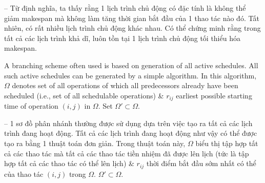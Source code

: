 \documentclass{article}
\begin{document}
\begin{itemize}
\begin{itemize}
        -- Từ định nghĩa, ta thấy rằng 1 lịch trình chủ động có đặc tính là không thể giảm makespan mà không làm tăng thời gian bắt đầu của 1 thao tác nào đó. Tất nhiên, có rất nhiều lịch trình chủ động khác nhau. Có thể chứng minh rằng trong tất cả các lịch trình khả dĩ, luôn tồn tại 1 lịch trình chủ động tối thiểu hóa makespan.

        A branching scheme often used is based on generation of all active schedules. All such active schedules can be generated by a simple algorithm. In this algorithm, $\Omega$ denotes set of all operations of which all predecessors already have been scheduled (i.e., set of all schedulable operations) \& $r_{ij}$ earliest possible starting time of operation $(i,j)$ in $\Omega$. Set $\Omega'\subset\Omega$.

        -- 1 sơ đồ phân nhánh thường được sử dụng dựa trên việc tạo ra tất cả các lịch trình đang hoạt động. Tất cả các lịch trình đang hoạt động như vậy có thể được tạo ra bằng 1 thuật toán đơn giản. Trong thuật toán này, $\Omega$ biểu thị tập hợp tất cả các thao tác mà tất cả các thao tác tiền nhiệm đã được lên lịch (tức là tập hợp tất cả các thao tác có thể lên lịch) \& $r_{ij}$ thời điểm bắt đầu sớm nhất có thể của thao tác $(i,j)$ trong $\Omega$. $\Omega'\subset\Omega$.


\end{itemize}
\end{itemize}
\end{document}
